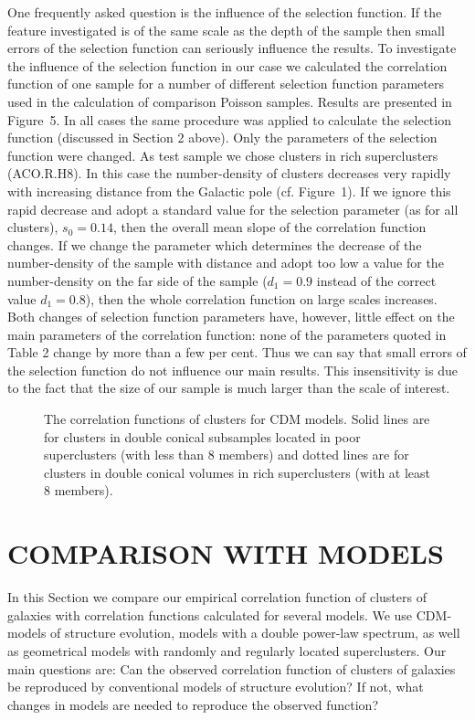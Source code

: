 One frequently asked question is the influence of the selection function. If
the feature investigated is of the same scale as the depth of the sample then
small errors of the selection function can seriously influence the results. To
investigate the influence of the selection function in our case we calculated
the correlation function of one sample for a number of different selection
function parameters used in the calculation of comparison Poisson samples.
Results are presented in Figure~5. In all cases the same procedure was applied
to calculate the selection function (discussed in Section 2 above).  Only the
parameters of the selection function were changed. As test sample we chose
clusters in rich superclusters (ACO.R.H8). In this case the number-density of
clusters decreases very rapidly with increasing distance from the Galactic
pole (cf. Figure~1). If we ignore this rapid decrease and adopt a standard
value for the selection parameter (as for all clusters), $s_0=0.14$, then the
overall mean slope of the correlation function changes. If we change the
parameter which determines the decrease of the number-density of the sample
with distance and adopt too low a value for the number-density on the far side
of the sample ($d_1=0.9$ instead of the correct value $d_1=0.8$), then the
whole correlation function on large scales increases. Both changes of
selection function parameters have, however, little effect on the main
parameters of the correlation function: none of the parameters quoted in Table
2 change by more than a few per cent. Thus we can say that small errors of the
selection function do not influence our main results. This insensitivity is
due to the fact that the size of our sample is much larger than the scale of
interest.


\begin{figure}
\vskip -10mm
\epsfysize=7cm
\caption{
The correlation functions of clusters for CDM models.  Solid lines
are for clusters in double conical subsamples located in poor
superclusters (with less than 8 members) and dotted lines are for clusters
in double conical volumes in rich superclusters (with at least 8
members).}
\label{fig6}
\end{figure}

\section{COMPARISON WITH MODELS}

In this Section we compare our empirical correlation function of
clusters of galaxies with correlation functions calculated for several
models. We use  CDM-models of structure evolution, models with a double
power-law spectrum, as well as geometrical models with randomly
and regularly located superclusters. Our main questions are: Can the
observed correlation function of clusters of galaxies be reproduced by
conventional models of structure evolution? If not, what changes in models
are needed to reproduce the observed function?


